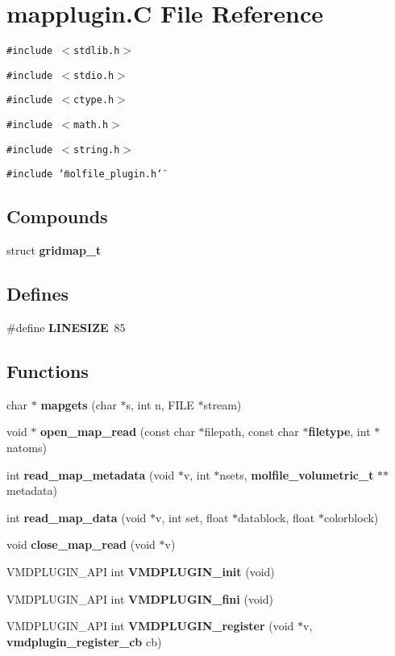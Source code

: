 \section{mapplugin.C File Reference}
\label{mapplugin_8C}
{\tt \#include $<$stdlib.h$>$}\par
{\tt \#include $<$stdio.h$>$}\par
{\tt \#include $<$ctype.h$>$}\par
{\tt \#include $<$math.h$>$}\par
{\tt \#include $<$string.h$>$}\par
{\tt \#include \char`\"{}molfile\_\-plugin.h\char`\"{}}\par
\subsection*{Compounds}
\begin{CompactItemize}
\item 
struct {\bf gridmap\_\-t}
\end{CompactItemize}
\subsection*{Defines}
\begin{CompactItemize}
\item 
\#define {\bf LINESIZE}\ 85
\end{CompactItemize}
\subsection*{Functions}
\begin{CompactItemize}
\item 
char $\ast$ {\bf mapgets} (char $\ast$s, int n, FILE $\ast$stream)
\item 
void $\ast$ {\bf open\_\-map\_\-read} (const char $\ast$filepath, const char $\ast${\bf filetype}, int $\ast$natoms)
\item 
int {\bf read\_\-map\_\-metadata} (void $\ast$v, int $\ast$nsets, {\bf molfile\_\-volumetric\_\-t} $\ast$$\ast$metadata)
\item 
int {\bf read\_\-map\_\-data} (void $\ast$v, int set, float $\ast$datablock, float $\ast$colorblock)
\item 
void {\bf close\_\-map\_\-read} (void $\ast$v)
\item 
VMDPLUGIN\_\-API int {\bf VMDPLUGIN\_\-init} (void)
\item 
VMDPLUGIN\_\-API int {\bf VMDPLUGIN\_\-fini} (void)
\item 
VMDPLUGIN\_\-API int {\bf VMDPLUGIN\_\-register} (void $\ast$v, {\bf vmdplugin\_\-register\_\-cb} cb)
\end{CompactItemize}

